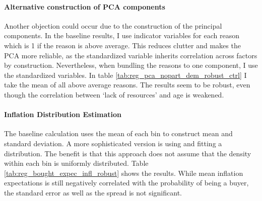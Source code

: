 \documentclass[ProjectABM]{subfiles}
\begin{document}
\paragraph{Alternative construction of PCA components}
Another objection could occur due to the construction of the principal components. In the baseline results, I use indicator variables for each reason which is 1 if the reason is above average. This reduces clutter and makes the PCA more reliable, as the standardized variable inherits correlation across factors by construction. Nevertheless, when bundling the reasons to one component, I use the standardized variables. In table \ref{tab:reg_pca_nopart_dem_robust_ctrl} I take the mean of all above average reasons. The results seem to be robust, even though the correlation between `lack of resources' and age is weakened.  

\paragraph{Inflation Distribution Estimation}
The baseline calculation uses the mean of each bin to construct mean and standard deviation. A more sophisticated version is using \cite{engelberg_manski_2009distribution} and fitting a distribution. The benefit is that this approach does not assume that the density within each bin is uniformly distributed. Table \ref{tab:reg_bought_expec_infl_robust} shows the results. While mean inflation expectations is still negatively correlated with the probability of being a buyer, the standard error as well as the spread is not significant. %

\end{document}

